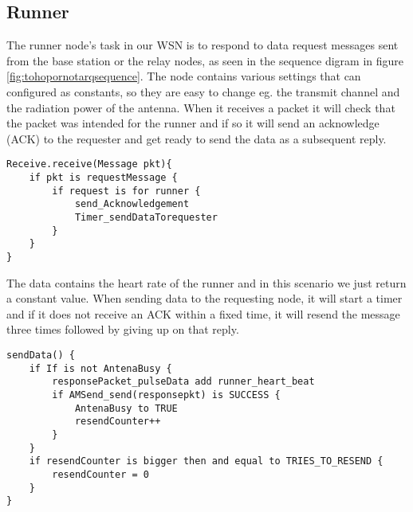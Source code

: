 \subsection{Runner}\label{sc:runner}

The runner node's task in our WSN is to respond to data request messages sent from the base station or the relay nodes, as seen in the sequence digram in figure \ref{fig:tohopornotarqsequence}. The node contains various settings that can configured as constants, so they are easy to change eg. the transmit channel and the radiation power of the antenna. When it receives a packet it will check that the packet was intended for the runner and if so it will send an acknowledge (ACK) to the requester and get ready to send the data as a subsequent reply.

\begin{minipage}[t]{0.95\linewidth}
\begin{lstlisting}[label={lst:runner1}, caption={Runner receives requests and responds.}]
Receive.receive(Message pkt){
	if pkt is requestMessage {
		if request is for runner {
			send_Acknowledgement
			Timer_sendDataTorequester
		}
	} 
}
\end{lstlisting}
\end{minipage}

\noindent The data contains the heart rate of the runner and in this scenario we just return a constant value. When sending data to the requesting node, it will start a timer and if it does not receive an ACK within a fixed time, it will resend the message three times followed by giving up on that reply.

\begin{minipage}[t]{0.95\linewidth}
\begin{lstlisting}[label={lst:runner2}, caption={Runner sends data packet with runner's heart rate.}]
sendData() {
	if If is not AntenaBusy {
		responsePacket_pulseData add runner_heart_beat
		if AMSend_send(responsepkt) is SUCCESS {
			AntenaBusy to TRUE
			resendCounter++
		}
	}
	if resendCounter is bigger then and equal to TRIES_TO_RESEND {
		resendCounter = 0
	}
}
\end{lstlisting}
\end{minipage}
